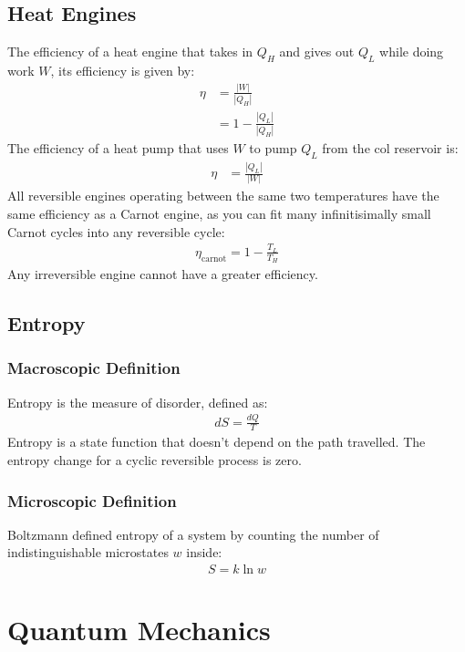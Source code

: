 \documentclass[11pt, letterpaper]{article}
\begin{document}
\begin{multicols*}{3}
\subsection{Heat Engines}
The efficiency of a heat engine that takes in $Q_H$ and gives out $Q_L$ while doing work $W$, its efficiency is given by:
\begin{align*}
  \eta &= \frac{|W|}{|Q_H|} \\
  &= 1 - \frac{|Q_L|}{|Q_H|}
\end{align*}
The efficiency of a heat pump that uses $W$ to pump $Q_L$ from the col reservoir is:
\begin{align*}
  \eta &= \frac{|Q_L|}{|W|}
\end{align*}
All reversible engines operating between the same two temperatures have the same efficiency as a Carnot engine, as you can fit many infinitisimally small Carnot cycles into any reversible cycle:
\begin{align*}
  \eta_{\text{carnot}} = 1 - \frac{T_L}{T_H}
\end{align*}
Any irreversible engine cannot have a greater efficiency.

\subsection{Entropy}
\subsubsection{Macroscopic Definition}
Entropy is the measure of disorder, defined as:
\begin{align*}
  dS = \frac{dQ}{T}
\end{align*}
Entropy is a state function that doesn't depend on the path travelled. The entropy change for a cyclic reversible process is zero.
\subsubsection{Microscopic Definition}
Boltzmann defined entropy of a system by counting the number of indistinguishable microstates $w$ inside:
\begin{align*}
  S = k \ln w
\end{align*}

\section{Quantum Mechanics}

\end{multicols*}
\end{document}
